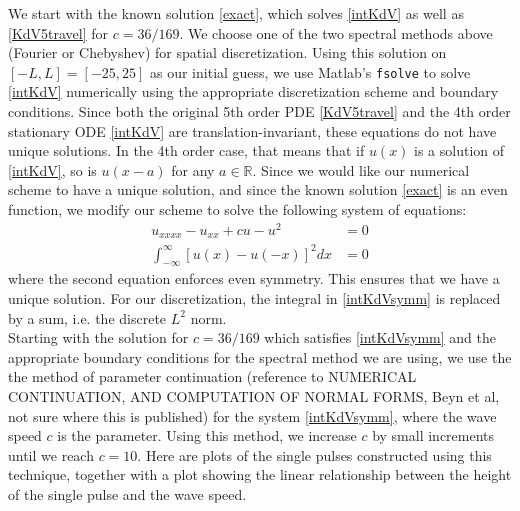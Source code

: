 \documentclass[12pt]{article}
\def\R{{\mathbb R}}
\begin{document}
We start with the known solution \eqref{exact}, which solves \eqref{intKdV} as well as \eqref{KdV5travel} for $c = 36/169$. We choose one of the two spectral methods above (Fourier or Chebyshev) for spatial discretization. Using this solution on $[-L, L] = [-25, 25]$ as our initial guess, we use Matlab's \texttt{fsolve} to solve \eqref{intKdV} numerically using the appropriate discretization scheme and boundary conditions. Since both the original 5th order PDE \eqref{KdV5travel} and the 4th order stationary ODE \eqref{intKdV} are translation-invariant, these equations do not have unique solutions. In the 4th order case, that means that if $u(x)$ is a solution of \eqref{intKdV}, so is $u(x - a)$ for any $a \in \R$. Since we would like our numerical scheme to have a unique solution, and since the known solution \eqref{exact} is an even function, we modify our scheme to solve the following system of equations:
\begin{align}\label{intKdVsymm}
u_{xxxx} - u_{xx} + c u - u^2 &= 0 \\
\int_{-\infty}^\infty \left[ u(x) - u(-x) \right]^2 dx &= 0
\end{align}
where the second equation enforces even symmetry. This ensures that we have a unique solution. For our discretization, the integral in \eqref{intKdVsymm} is replaced by a sum, i.e. the discrete $L^2$ norm.\\

Starting with the solution for $c = 36/169$ which satisfies \eqref{intKdVsymm} and the appropriate boundary conditions for the spectral method we are using, we use the the method of parameter continuation (reference to NUMERICAL CONTINUATION, AND COMPUTATION OF NORMAL FORMS, Beyn et al, not sure where this is published) for the system \eqref{intKdVsymm}, where the wave speed $c$ is the parameter. Using this method, we increase $c$ by small increments until we reach $c = 10$. Here are plots of the single pulses constructed using this technique, together with a plot showing the linear relationship between the height of the single pulse and the wave speed.
\end{document}
